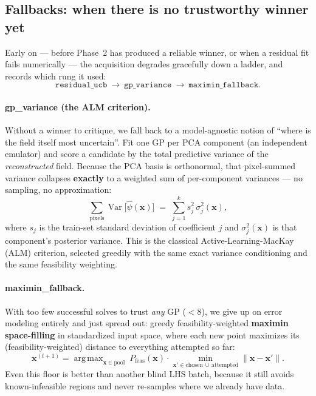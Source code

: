 \documentclass[11pt]{article}
\newcommand{\bx}{\mathbf{x}}
\DeclareMathOperator{\Var}{Var}
\DeclareMathOperator*{\argmax}{arg\,max}
\begin{document}
\subsection{Fallbacks: when there is no trustworthy winner yet}
Early on --- before Phase~2 has produced a reliable winner, or when a residual fit fails
numerically --- the acquisition degrades gracefully down a ladder, and records which rung it used:
\begin{equation}
\texttt{residual\_ucb}\ \longrightarrow\ \texttt{gp\_variance}\ \longrightarrow\ \texttt{maximin\_fallback}.
\end{equation}

\paragraph{gp\_variance (the ALM criterion).} Without a winner to critique, we fall back to a
model-agnostic notion of ``where is the field itself most uncertain''. Fit one GP per PCA component
(an independent emulator) and score a candidate by the total predictive variance of the
\emph{reconstructed} field. Because the PCA basis is orthonormal, that pixel-summed variance
collapses \textbf{exactly} to a weighted sum of per-component variances --- no sampling, no
approximation:
\begin{equation}
\sum_{\text{pixels}}\Var\big[\hat\psi(\bx)\big] \;=\; \sum_{j=1}^{k} s_j^2\,\sigma_j^2(\bx),
\end{equation}
where $s_j$ is the train-set standard deviation of coefficient $j$ and $\sigma_j^2(\bx)$ is that
component's posterior variance. This is the classical Active-Learning-MacKay (ALM) criterion,
selected greedily with the same exact variance conditioning and the same feasibility weighting.

\paragraph{maximin\_fallback.} With too few successful solves to trust \emph{any} GP ($<8$), we
give up on error modeling entirely and just spread out: greedy feasibility-weighted \textbf{maximin
space-filling} in standardized input space, where each new point maximizes its (feasibility-weighted)
distance to everything attempted so far:
\begin{equation}
\bx^{(t+1)} = \argmax_{\bx\in\text{pool}}\ P_{\text{feas}}(\bx)\cdot \min_{\bx'\in\text{chosen}\,\cup\,\text{attempted}} \|\bx-\bx'\| .
\end{equation}
Even this floor is better than another blind LHS batch, because it still avoids known-infeasible
regions and never re-samples where we already have data.
\end{document}
